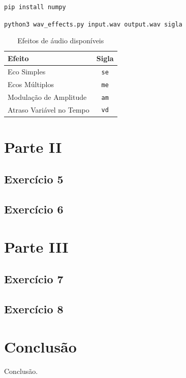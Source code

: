 \documentclass[11pt,a4paper]{report}
\begin{document}
\texttt{pip install numpy}

\texttt{python3 wav\_effects.py input.wav output.wav sigla}

\begin{table}[H]
\centering
\label{tab:efeitos}
\begin{tabular}{lc}
\toprule
Efeito & Sigla \\
\midrule
Eco Simples & \texttt{se} \\
Ecos Múltiplos & \texttt{me} \\
Modulação de Amplitude & \texttt{am} \\
Atraso Variável no Tempo & \texttt{vd} \\
\bottomrule
\end{tabular}
\caption{Efeitos de áudio disponíveis}
\end{table}


\chapter{Parte II}

\section{Exercício 5}

\section{Exercício 6}


\chapter{Parte III}

\section{Exercício 7}

\section{Exercício 8}


\chapter{Conclusão}
Conclusão.
\end{document}
